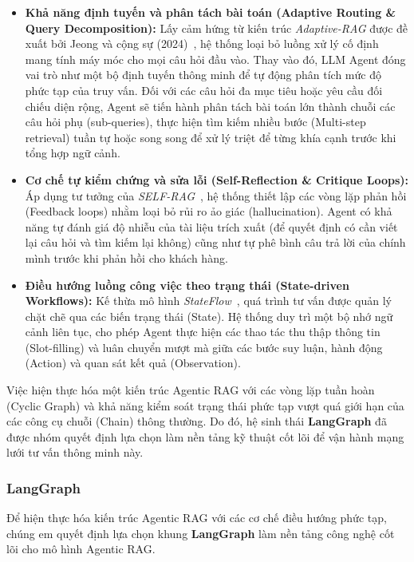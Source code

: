 \begin{itemize}
    \item \textbf{Khả năng định tuyến và phân tách bài toán (Adaptive Routing \& Query Decomposition):} Lấy cảm hứng từ kiến trúc \textit{Adaptive-RAG} được đề xuất bởi Jeong và cộng sự (2024)~\cite{jeong2024adaptiverag}, hệ thống loại bỏ luồng xử lý cố định mang tính máy móc cho mọi câu hỏi đầu vào. Thay vào đó, LLM Agent đóng vai trò như một bộ định tuyến thông minh để tự động phân tích mức độ phức tạp của truy vấn. Đối với các câu hỏi đa mục tiêu hoặc yêu cầu đối chiếu diện rộng, Agent sẽ tiến hành phân tách bài toán lớn thành chuỗi các câu hỏi phụ (sub-queries), thực hiện tìm kiếm nhiều bước (Multi-step retrieval) tuần tự hoặc song song để xử lý triệt để từng khía cạnh trước khi tổng hợp ngữ cảnh.

    \item \textbf{Cơ chế tự kiểm chứng và sửa lỗi (Self-Reflection \& Critique Loops):} Áp dụng tư tưởng của \textit{SELF-RAG}~\cite{asai2024selfrag}, hệ thống thiết lập các vòng lặp phản hồi (Feedback loops) nhằm loại bỏ rủi ro ảo giác (hallucination). Agent có khả năng tự đánh giá độ nhiễu của tài liệu trích xuất (để quyết định có cần viết lại câu hỏi và tìm kiếm lại không) cũng như tự phê bình câu trả lời của chính mình trước khi phản hồi cho khách hàng.

    \item \textbf{Điều hướng luồng công việc theo trạng thái (State-driven Workflows):} Kế thừa mô hình \textit{StateFlow}~\cite{wu2024stateflow}, quá trình tư vấn được quản lý chặt chẽ qua các biến trạng thái (State). Hệ thống duy trì một bộ nhớ ngữ cảnh liên tục, cho phép Agent thực hiện các thao tác thu thập thông tin (Slot-filling) và luân chuyển mượt mà giữa các bước suy luận, hành động (Action) và quan sát kết quả (Observation).
\end{itemize}

Việc hiện thực hóa một kiến trúc Agentic RAG với các vòng lặp tuần hoàn (Cyclic Graph) và khả năng kiểm soát trạng thái phức tạp vượt quá giới hạn của các công cụ chuỗi (Chain) thông thường. Do đó, hệ sinh thái \textbf{LangGraph} đã được nhóm quyết định lựa chọn làm nền tảng kỹ thuật cốt lõi để vận hành mạng lưới tư vấn thông minh này.

\subsubsection{LangGraph}

Để hiện thực hóa kiến trúc Agentic RAG với các cơ chế điều hướng phức tạp, chúng em quyết định lựa chọn khung \textbf{LangGraph} làm nền tảng công nghệ cốt lõi cho mô hình Agentic RAG. 

